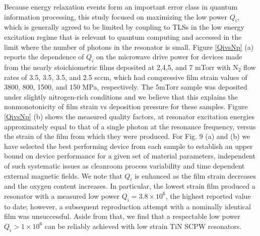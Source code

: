  Because energy relaxation events form an important error class in quantum information processing, this study focused on maximizing the low power $Q_{i}$, which is generally agreed to be limited by coupling to TLSs in the low energy excitation regime that is relevant to quantum computing and accessed in the limit where the number of photons in the resonator is small.  Figure \ref{QivsNp} (a) reports the dependence of $Q_{i}$ on the microwave drive power for devices made from the nearly stoichiometric films deposited at 2,4,5, and 7 mTorr with N$_{2}$ flow rates of 3.5, 3.5, 3.5, and 2.5 sccm, which had compressive film strain values of  3800, 800, 1500, and 150 MPa, respectively.  The 5mTorr sample was deposited under slightly nitrogen-rich conditions and we believe that this explains the nonmonotonicity of film strain vs deposition pressure for these samples.  Figure \ref{QivsNp} (b) shows the measured quality factors, at resonator excitation energies approximately equal to that of a single photon at the resonance frequency, versus the strain of the film from which they were produced.  For Fig. 9 (a) and (b) we have selected the best performing device from each sample to establish an upper bound on device performance for a  given set of material parameters, independent of such systematic issues as cleanroom process variability and time dependent external magnetic fields.  We note that $Q_{i}$ is enhanced as the film strain decreases and the oxygen content increases.  In particular, the lowest strain film produced a resonator with a measured low power $Q_{i} = 3.8 \times 10^{6}$, the highest reported value to date; however,  a subsequent reproduction attempt with a nominally identical film was unsuccessful.  Aside from that, we find that a respectable low power $Q_{i} >1 \times 10^{6}$ can be reliably achieved with low strain TiN SCPW resonators.
 
